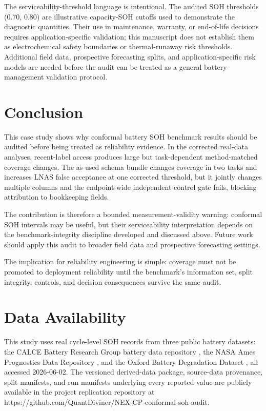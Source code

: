 \documentclass[
  number,
  preprint]{elsarticle}
\begin{document}
The serviceability-threshold language is intentional. The audited SOH
thresholds (0.70, 0.80) are illustrative capacity-SOH cutoffs used to
demonstrate the diagnostic quantities. Their use in maintenance,
warranty, or end-of-life decisions requires application-specific
validation; this manuscript does not establish them as electrochemical
safety boundaries or thermal-runaway risk thresholds. Additional field
data, prospective forecasting splits, and application-specific risk
models are needed before the audit can be treated as a general
battery-management validation protocol.

\section{Conclusion}\label{sec-conclusion}

This case study shows why conformal battery SOH benchmark results should
be audited before being treated as reliability evidence. In the
corrected real-data analyses, recent-label access produces large but
task-dependent method-matched coverage changes. The as-used schema
bundle changes coverage in two tasks and increases LNAS false acceptance
at one corrected threshold, but it jointly changes multiple columns and
the endpoint-wide independent-control gate fails, blocking attribution
to bookkeeping fields.

The contribution is therefore a bounded measurement-validity warning:
conformal SOH intervals may be useful, but their serviceability
interpretation depends on the benchmark-integrity discipline developed
and discussed above. Future work should apply this audit to broader
field data and prospective forecasting settings.

The implication for reliability engineering is simple: coverage must not
be promoted to deployment reliability until the benchmark's information
set, split integrity, controls, and decision consequences survive the
same audit.

\section*{Data Availability}\label{data-availability}

This study uses real cycle-level SOH records from three public battery
datasets: the CALCE Battery Research Group battery data repository
\citep{calce_battery_data}, the NASA Ames Prognostics Data Repository
\citep{nasa_pcoe_battery_data}, and the Oxford Battery Degradation
Dataset \citep{howey2017oxford}, all accessed 2026-06-02. The versioned
derived-data package, source-data provenance, split manifests, and run
manifests underlying every reported value are publicly available in the
project replication repository at
https://github.com/QuantDiviner/NEX-CP-conformal-soh-audit.
\end{document}

